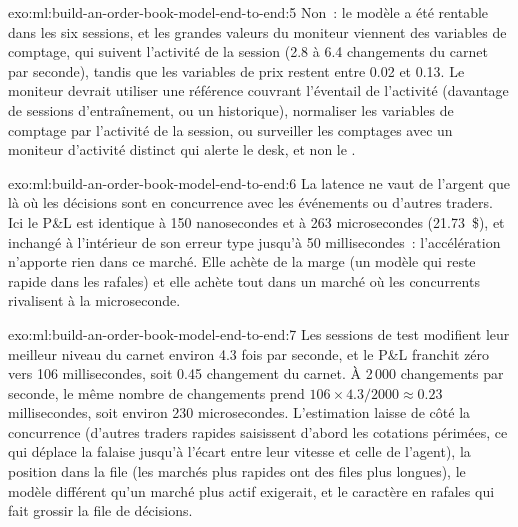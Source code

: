 \begin{solution}{exo:ml:build-an-order-book-model-end-to-end:5}
Non~: le modèle a été rentable dans les six sessions, et les grandes valeurs du moniteur viennent des variables de comptage, qui
suivent l'activité de la session (2.8 à 6.4 changements du carnet par seconde), tandis que les variables de prix restent entre 0.02 et 0.13. Le
moniteur devrait utiliser une référence couvrant l'éventail de l'activité (davantage de sessions d'entraînement, ou un historique), normaliser les variables de comptage par
l'activité de la session, ou surveiller les comptages avec un moniteur d'activité distinct qui alerte le desk, et non le .
\end{solution}

\begin{solution}{exo:ml:build-an-order-book-model-end-to-end:6}
La latence ne vaut de l'argent que là où les décisions sont en concurrence avec les événements ou d'autres traders. Ici le P\&L est identique à 150 nanosecondes
et à 263 microsecondes (21.73~\$), et inchangé à l'intérieur de son erreur type jusqu'à 50 millisecondes~: l'accélération n'apporte rien dans
ce marché. Elle achète de la marge (un modèle qui reste rapide dans les rafales) et elle achète tout dans un marché où les concurrents
rivalisent à la microseconde.
\end{solution}

\begin{solution}{exo:ml:build-an-order-book-model-end-to-end:7}
Les sessions de test modifient leur meilleur niveau du carnet environ 4.3 fois par seconde, et le P\&L franchit zéro vers 106 millisecondes, soit
0.45 changement du carnet. À 2\,000 changements par seconde, le même nombre de changements prend $106\times4.3/2000\approx0.23$ millisecondes, soit environ
230 microsecondes. L'estimation laisse de côté la concurrence (d'autres traders rapides saisissent d'abord les cotations périmées, ce qui déplace la falaise jusqu'à
l'écart entre leur vitesse et celle de l'agent), la position dans la file (les marchés plus rapides ont des files plus longues), le modèle différent
qu'un marché plus actif exigerait, et le caractère en rafales qui fait grossir la file de décisions.
\end{solution}

